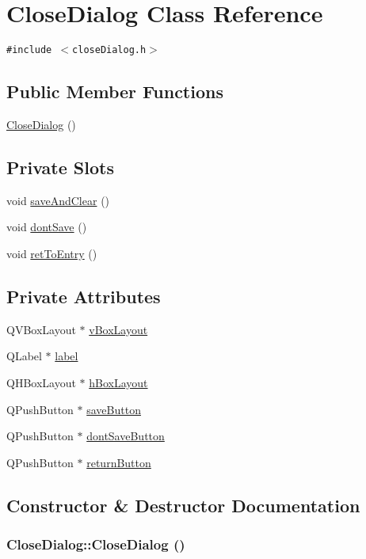 \hypertarget{classCloseDialog}{
\section{Close\-Dialog Class Reference}
\label{classCloseDialog}
}
{\tt \#include $<$close\-Dialog.h$>$}

\subsection*{Public Member Functions}
\begin{CompactItemize}
\item 
\hyperlink{classCloseDialog_a0}{Close\-Dialog} ()
\end{CompactItemize}
\subsection*{Private Slots}
\begin{CompactItemize}
\item 
void \hyperlink{classCloseDialog_k0}{save\-And\-Clear} ()
\item 
void \hyperlink{classCloseDialog_k1}{dont\-Save} ()
\item 
void \hyperlink{classCloseDialog_k2}{ret\-To\-Entry} ()
\end{CompactItemize}
\subsection*{Private Attributes}
\begin{CompactItemize}
\item 
QVBox\-Layout $\ast$ \hyperlink{classCloseDialog_r0}{v\-Box\-Layout}
\item 
QLabel $\ast$ \hyperlink{classCloseDialog_r1}{label}
\item 
QHBox\-Layout $\ast$ \hyperlink{classCloseDialog_r2}{h\-Box\-Layout}
\item 
QPush\-Button $\ast$ \hyperlink{classCloseDialog_r3}{save\-Button}
\item 
QPush\-Button $\ast$ \hyperlink{classCloseDialog_r4}{dont\-Save\-Button}
\item 
QPush\-Button $\ast$ \hyperlink{classCloseDialog_r5}{return\-Button}
\end{CompactItemize}


\subsection{Constructor \& Destructor Documentation}
\hypertarget{classCloseDialog_a0}{
\subsubsection[CloseDialog]{\setlength{\rightskip}{0pt plus 5cm}Close\-Dialog::Close\-Dialog ()}}
\label{classCloseDialog_a0}


